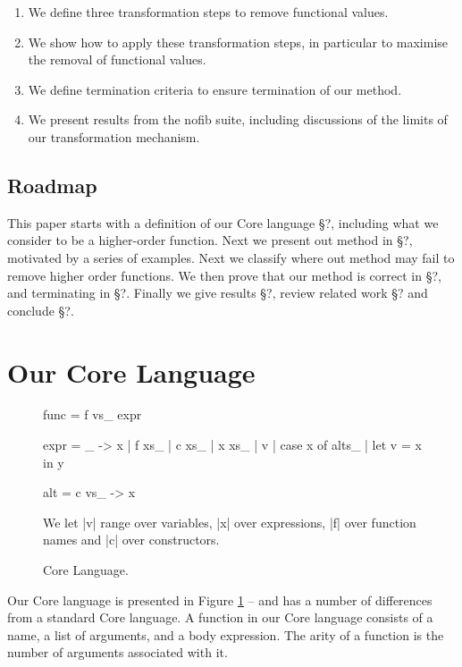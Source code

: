 \documentclass[preprint]{sigplanconf}
\begin{document}
\begin{enumerate}
\item We define three transformation steps to remove functional values.
\item We show how to apply these transformation steps, in particular to maximise the removal of functional values.
\item We define termination criteria to ensure termination of our method.
\item We present results from the nofib suite, including discussions of the limits of our transformation mechanism.
\end{enumerate}

\subsection{Roadmap}

This paper starts with a definition of our Core language \S?, including what we consider to be a higher-order function. Next we present out method in \S?, motivated by a series of examples. Next we classify where out method may fail to remove higher order functions. We then prove that our method is correct in \S?, and terminating in \S?. Finally we give results \S?, review related work \S? and conclude \S?.

\section{Our Core Language}

\begin{figure}
\begin{code}
func = f vs_ expr

expr  =  \vs_ -> x
      |  f xs_
      |  c xs_
      |  x xs_
      |  v
      |  case x of alts_
      |  let v = x in y

alt = c vs_ -> x
\end{code}

We let |v| range over variables, |x| over expressions, |f| over function names and |c| over constructors.
\caption{Core Language.}
\label{fig:core}
\end{figure}

Our Core language is presented in Figure \ref{fig:core} -- and has a number of differences from a standard Core language. A function in our Core language consists of a name, a list of arguments, and a body expression. The arity of a function is the number of arguments associated with it.
\end{document}
